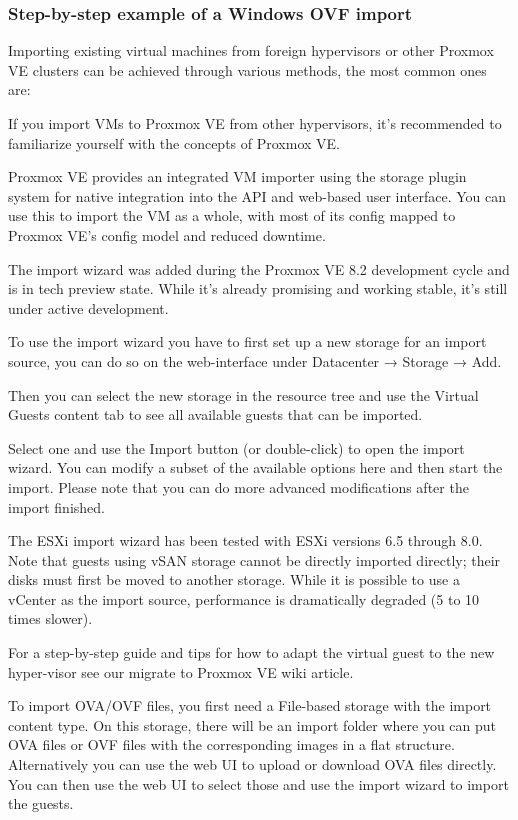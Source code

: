 \subsubsection{Step-by-step example of a Windows OVF import}

Importing existing virtual machines from foreign hypervisors or other Proxmox VE clusters can be achieved through various methods, the most common ones are:

If you import VMs to Proxmox VE from other hypervisors, it’s recommended to familiarize yourself with the concepts of Proxmox VE.

Proxmox VE provides an integrated VM importer using the storage plugin system for native integration into the API and web-based user interface. You can use this to import the VM as a whole, with most of its config mapped to Proxmox VE’s config model and reduced downtime.

The import wizard was added during the Proxmox VE 8.2 development cycle and is in tech preview state. While it’s already promising and working stable, it’s still under active development.

To use the import wizard you have to first set up a new storage for an import source, you can do so on the web-interface under Datacenter → Storage → Add.

Then you can select the new storage in the resource tree and use the Virtual Guests content tab to see all available guests that can be imported.

Select one and use the Import button (or double-click) to open the import wizard. You can modify a subset of the available options here and then start the import. Please note that you can do more advanced modifications after the import finished.

The ESXi import wizard has been tested with ESXi versions 6.5 through 8.0. Note that guests using vSAN storage cannot be directly imported directly; their disks must first be moved to another storage. While it is possible to use a vCenter as the import source, performance is dramatically degraded (5 to 10 times slower).

For a step-by-step guide and tips for how to adapt the virtual guest to the new hyper-visor see our migrate to Proxmox VE wiki article.

To import OVA/OVF files, you first need a File-based storage with the import content type. On this storage, there will be an import folder where you can put OVA files or OVF files with the corresponding images in a flat structure. Alternatively you can use the web UI to upload or download OVA files directly. You can then use the web UI to select those and use the import wizard to import the guests.

